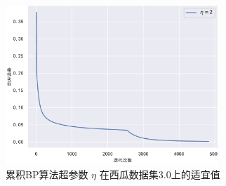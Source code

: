 \documentclass{ctexart}
\begin{document}
	\begin{figure}[!htb]
		\centering
		\includegraphics[height=6cm]{../image/累积BP较好值.pdf}
		\caption{累积BP算法超参数 $\eta$ 在西瓜数据集3.0上的适宜值}
		\label{累积BP适宜值}
	\end{figure}
	
\end{document}
